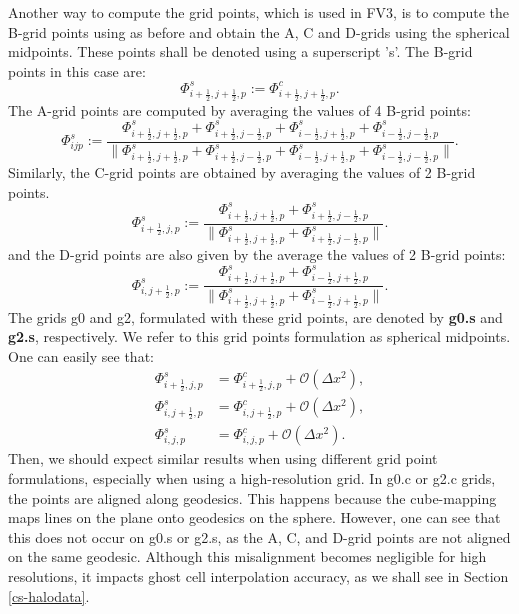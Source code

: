 Another way to compute the grid points, which is used in FV3, is to compute the B-grid
points using as before and obtain the A, C and D-grids using the spherical midpoints.
These points shall be denoted using a superscript 's'.
The B-grid points in this case are:
\begin{equation}
	\Phi_{i+\frac{1}{2},j+\frac{1}{2},p}^s := \Phi_{i+\frac{1}{2},j+\frac{1}{2},p}^c.
\end{equation}
The A-grid points are computed by averaging the values of 4 B-grid points:
\begin{equation}
	\Phi_{ijp}^s :=
	\frac{\Phi_{i+\frac{1}{2},j+\frac{1}{2},p}^s + \Phi_{i+\frac{1}{2},j-\frac{1}{2},p}^s + \Phi_{i-\frac{1}{2},j+\frac{1}{2},p}^s + \Phi_{i-\frac{1}{2},j-\frac{1}{2},p}^s}
         {\|\Phi_{i+\frac{1}{2},j+\frac{1}{2},p}^s + \Phi_{i+\frac{1}{2},j-\frac{1}{2},p}^s + \Phi_{i-\frac{1}{2},j+\frac{1}{2},p}^s + \Phi_{i-\frac{1}{2},j-\frac{1}{2},p}^s\|}.
\end{equation}
Similarly, the C-grid points are obtained by averaging the values of 2 B-grid points.
\begin{equation}
	\Phi_{i+\frac{1}{2},j,p}^s :=
	\frac{\Phi_{i+\frac{1}{2},j+\frac{1}{2},p}^s + \Phi_{i+\frac{1}{2},j-\frac{1}{2},p}^s}
	   {\|\Phi_{i+\frac{1}{2},j+\frac{1}{2},p}^s + \Phi_{i+\frac{1}{2},j-\frac{1}{2},p}^s\|}.
\end{equation}
and the D-grid points are also  given by the average  the values of 2 B-grid points:
\begin{equation}
	\Phi_{i,j+\frac{1}{2},p}^s :=
	\frac{\Phi_{i+\frac{1}{2},j+\frac{1}{2},p}^s + \Phi_{i-\frac{1}{2},j+\frac{1}{2},p}^s}
	     {\|\Phi_{i+\frac{1}{2},j+\frac{1}{2},p}^s + \Phi_{i-\frac{1}{2},j+\frac{1}{2},p}^s\|}.
\end{equation}
The grids g0 and g2, formulated with these grid points, are denoted by \textbf{g0.s} and \textbf{g2.s}, respectively.
We refer to this grid points formulation as spherical midpoints.
One can easily see that:
\begin{align}
	\Phi_{i+\frac{1}{2},j,p}^s &= \Phi_{i+\frac{1}{2},j,p}^c+ \mathcal{O}(\Delta x^2),\\
	\Phi_{i,j+\frac{1}{2},p}^s &= \Phi_{i,j+\frac{1}{2},p}^c+ \mathcal{O}(\Delta x^2),\\
	\Phi_{i,j,p}^s &= \Phi_{i,j,p}^c + \mathcal{O}(\Delta x^2).
\end{align}
Then, we should expect similar results when using different grid point formulations, especially when using a high-resolution grid.
In g0.c or g2.c grids, the points are aligned along geodesics.
This happens because the cube-mapping maps lines on the plane onto geodesics on the sphere.
However, one can see that this does not occur on g0.s or g2.s, as the A, C, and D-grid points are not aligned on the same geodesic.
Although this misalignment becomes negligible for high resolutions,
it impacts ghost cell interpolation accuracy, as we shall see in Section \ref{cs-halodata}.

